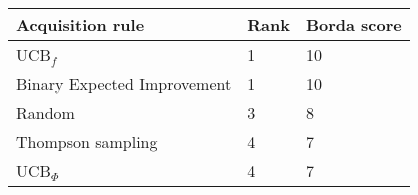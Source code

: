 \begin{tabular}{lll}
Acquisition rule & Rank & Borda score \\ 
\hline 
UCB$_f$ \citep{Tesch2013}                     & 1 & 10 \\ 
Binary Expected Improvement \citep{Tesch2013} & 1 & 10 \\ 
Random                                        & 3 & 8 \\ 
Thompson sampling                             & 4 & 7 \\ 
UCB$_\Phi$                                    & 4 & 7 \\ 
\hline 
\end{tabular}